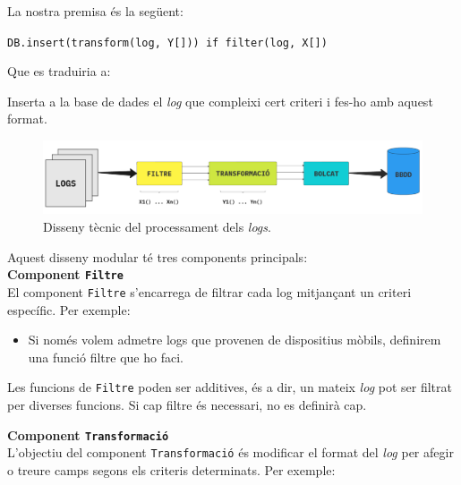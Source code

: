 \noindent
La nostra premisa és la següent:
\noindent
\begin{center}
    \texttt{DB.insert(transform(log, Y[])) if filter(log, X[])}
\end{center}

\noindent
Que es traduiria a:
\begin{center}
    Inserta a la base de dades el \textit{log} que compleixi cert criteri i fes-ho amb aquest format.
\end{center}

\begin{figure}[htbp]
    \centerline{\includegraphics[width=1\textwidth]{figures/log-processing}}
    \captionsetup{justification=centering}
    \caption{Disseny tècnic del processament dels \textit{logs}.}\label{fig:log-processing}
\end{figure}

\noindent
Aquest disseny modular té tres components principals: \\

\noindent
\textbf{Component \texttt{Filtre}} \\

\noindent
El component \texttt{Filtre} s’encarrega de filtrar cada log mitjançant un criteri específic.
Per exemple:
\begin{itemize}
    \item Si només volem admetre logs que provenen de dispositius mòbils, definirem una funció filtre que ho faci.
\end{itemize}

\noindent
Les funcions de \texttt{Filtre} poden ser additives, és a dir, un mateix \textit{log} pot ser filtrat per diverses funcions.
Si cap filtre és necessari, no es definirà cap. \\

\clearpage

\noindent
\textbf{Component \texttt{Transformació}} \\

\noindent
L’objectiu del component \texttt{Transformació} és modificar el format del \textit{log} per afegir o treure camps segons els criteris determinats.
Per exemple:

